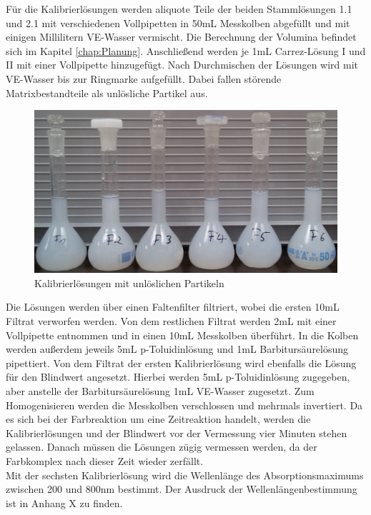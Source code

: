 Für die Kalibrierlösungen werden aliquote Teile der beiden Stammlösungen 1.1 und 2.1 mit verschiedenen Vollpipetten in 50mL Messkolben abgefüllt und mit einigen Millilitern VE-Wasser vermischt. Die Berechnung der Volumina befindet sich im Kapitel \ref{chap:Planung}. Anschließend werden je 1mL Carrez-Lösung I und II mit einer Vollpipette hinzugefügt. Nach Durchmischen der Lösungen wird mit VE-Wasser bis zur Ringmarke aufgefüllt. Dabei fallen störende Matrixbestandteile als unlösliche Partikel aus.\\
\begin{figure}[htbp]
	\centering
		\includegraphics[width=1.00\textwidth]{../Bilder/20150424_155955.jpg}
	\caption{Kalibrierlösungen mit unlöslichen Partikeln}
	\label{fig:Partikel}
\end{figure}
Die Lösungen werden über einen Faltenfilter filtriert, wobei die ersten 10mL Filtrat verworfen werden. Von dem restlichen Filtrat werden 2mL mit einer Vollpipette entnommen und in einen 10mL Messkolben überführt. In die Kolben werden außerdem jeweils 5mL p-Toluidinlösung und 1mL Barbitursäurelösung pipettiert. Von dem Filtrat der ersten Kalibrierlösung wird ebenfalls die Lösung für den Blindwert angesetzt. Hierbei werden 5mL p-Toluidinlösung zugegeben, aber anstelle der Barbitursäurelösung 1mL VE-Wasser zugesetzt. Zum Homogenisieren werden die Messkolben verschlossen und mehrmals invertiert. Da es sich bei der Farbreaktion um eine Zeitreaktion handelt, werden die Kalibrierlösungen und der Blindwert vor der Vermessung vier Minuten stehen gelassen. Danach müssen die Lösungen zügig vermessen werden, da der Farbkomplex nach dieser Zeit wieder zerfällt.\\
Mit der sechsten Kalibrierlösung wird die Wellenlänge des Absorptionsmaximums zwischen 200 und 800nm bestimmt. Der Ausdruck der Wellenlängenbestimmung ist in Anhang X zu finden.

